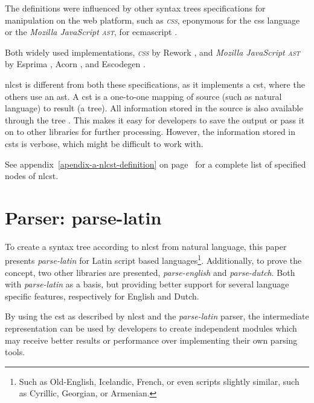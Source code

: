The definitions were influenced by other syntax trees specifications for
  manipulation on the web platform, such as \emph{\textsc{css}}, eponymous
  for the \acrshort{css} language \autocite{reworkcss/css-source-code} or the
  \emph{Mozilla JavaScript \textsc{ast}}, for \gls{ecmascript}
  \autocite{mozilla.org-spidermonkey-parser_api}.

Both widely used implementations, \emph{\textsc{css}} by Rework
  \autocite{reworkcss/rework-source-code}, and \emph{Mozilla JavaScript
  \textsc{ast}} by Esprima \autocite{ariya/esprima-source-code}, Acorn
  \autocite{marijnh/acorn-source-code}, and Escodegen
  \autocite{constellation/escodegen-source-code}.

\gls{nlcst} is different from both these specifications, as it implements a
  \gls{cst}, where the others use an \gls{ast}.
A \gls{cst} is a one-to-one mapping of source (such as natural language)
  to result (a tree).
All information stored in the source is also available through the tree
  \autocite{thegreenplace.net-abstract-concrete-syntax-trees}.
This makes it easy for developers to save the output or pass it on to other
  libraries for further processing.
However, the information stored in \glspl{cst} is verbose, which might be
  difficult to work with.

\medskip \noindent See appendix~\ref{apendix-a-nlcst-definition} on
page~\pageref{apendix-a-nlcst-definition} for a complete list of
specified nodes of \gls{nlcst}.

\section{Parser: parse-latin}\label{parser-parse-latin}

To create a syntax tree according to \gls{nlcst} from natural language,
  this paper presents \emph{parse-latin} for Latin script based
  languages\footnote{Such
    as Old-English, Icelandic, French, or even scripts slightly similar, such
    as Cyrillic, Georgian, or Armenian.}.
Additionally, to prove the concept, two other libraries are presented,
  \emph{parse-english} and \emph{parse-dutch}. Both with \emph{parse-latin}
  as a basis, but providing better support for several language specific
  features, respectively for English and Dutch.

By using the \gls{cst} as described by \gls{nlcst} and the \emph{parse-latin}
  parser, the intermediate representation can be used by developers to
  create independent modules which may receive better results or
  performance over implementing their own parsing tools.

